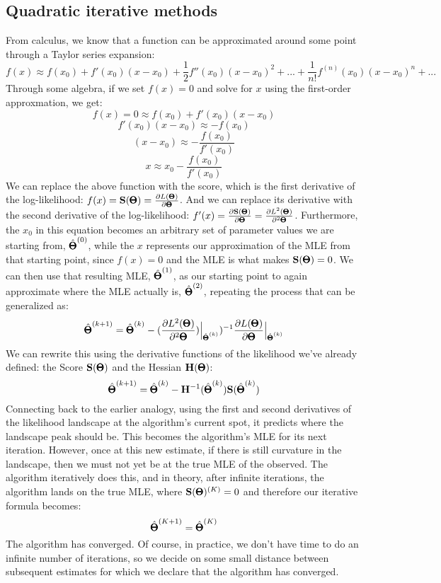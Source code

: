 \documentclass[12pt]{article}
\begin{document}
\subsection{Quadratic iterative methods}
From calculus, we know that a function can be approximated around some point through a Taylor series expansion:
$$
f(x) \approx f(x_0) + f'(x_0)(x - x_0) + \frac{1}{2} f''(x_0)(x - x_0)^2 + ... + \frac{1}{n!}f^{(n)}(x_0) (x - x_0)^n + ...
$$
Through some algebra, if we set $f(x) = 0$ and solve for $x$ using the first-order approxmation, we get:
$$ f(x) = 0 \approx f(x_0) + f'(x_0)(x - x_0) $$
$$ f'(x_0)(x - x_0) \approx - f(x_0)$$
$$ (x - x_0) \approx - \frac{f(x_0)}{f'(x_0)} $$
$$ x \approx x_0 - \frac{f(x_0)}{f'(x_0)} $$
We can replace the above function with the score, which is the first derivative of the log-likelihood:
$f(x) = \mathbf{S}(\pmb{\Theta}) = \frac{\partial L(\pmb{\Theta})}{\partial \pmb{\Theta}}$.
And we can replace its derivative with the second derivative of the log-likelihood:
$f'(x) = \frac{\partial \mathbf{S}(\pmb{\Theta})}{\partial \pmb{\Theta}} = \frac{\partial L^2(\pmb{\Theta})}{\partial^2 \pmb{\Theta}} $.
Furthermore, the $x_0$ in this equation becomes an arbitrary set of parameter values we are starting from, $\hat{\pmb{\Theta}}^{(0)}$,
while the $x$ represents our approximation of the MLE from that starting point, since $f(x) = 0$ and the MLE is what makes $\mathbf{S}(\pmb{\Theta}) = 0$.
We can then use that resulting MLE, $\hat{\pmb{\Theta}}^{(1)}$, as our starting point to again approximate where the MLE actually is, $\hat{\pmb{\Theta}}^{(2)}$, repeating the process that can be generalized as:
$$
\hat{\pmb{\Theta}}^{(k+1)} = 
\hat{\pmb{\Theta}}^{(k)} -
(\frac{\partial L^2(\pmb{\Theta})}{\partial^2 \pmb{\Theta}})
\Bigr|_{\hat{\pmb{\Theta}}^{(k)} })^{-1} 
\frac{\partial L(\pmb{\Theta})}{\partial \pmb{\Theta}}
\Bigr|_{\hat{\pmb{\Theta}}^{(k)} }
$$
We can rewrite this using the derivative functions of the likelihood we've already defined: the Score $\mathbf{S}(\pmb{\Theta})$ and the Hessian $\mathbf{H}(\pmb{\Theta})$:
$$
\hat{\pmb{\Theta}}^{(k+1)} = 
\hat{\pmb{\Theta}}^{(k)} -
\mathbf{H}^{-1} (\hat{\pmb{\Theta}}^{(k)})
\mathbf{S}(\hat{\pmb{\Theta}}^{(k)})
$$
Connecting back to the earlier analogy, using the first and second derivatives of the likelihood landscape at the algorithm's current spot, it predicts where the landscape peak should be.
This becomes the algorithm's MLE for its next iteration.
However, once at this new estimate, if there is still curvature in the landscape, then we must not yet be at the true MLE of the observed.
The algorithm iteratively does this, and in theory, after infinite iterations, the algorithm lands on the true MLE, where $\mathbf{S}(\pmb{\Theta})^{(K)} = 0$ and therefore our iterative formula becomes:
$$ \hat{\pmb{\Theta}}^{(K+1)} = \hat{\pmb{\Theta}}^{(K)}$$
The algorithm has converged. Of course, in practice, we don't have time to do an infinite number of iterations, so we decide on some small distance between subsequent estimates for which we declare that the algorithm has converged.
\end{document}
